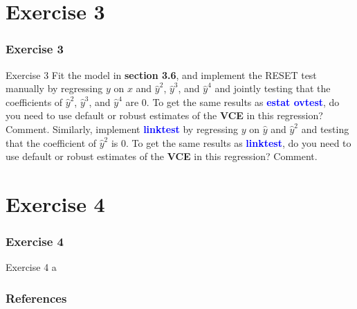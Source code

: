 \documentclass[11pt, aspectratio=169]{beamer}
\begin{document}
	\section{Exercise 3}
		\begin{frame}
			\frametitle{Exercise 3}
			\begin{block}{Exercise 3}
				Fit the model in \textcolor{red!50}{\textbf{section 3.6}}, and implement the RESET test manually by
				regressing $y$ on $x$ and $\hat{y}^{2}$, $\hat{y}^{3}$, and $\hat{y}^{4}$ and jointly testing that the
				coefficients of $\hat{y}^{2}$, $\hat{y}^{3}$, and $\hat{y}^{4}$ are $0$. 
				To get the same results as \textcolor{blue}{\textbf{estat ovtest}}, 
				do you need to use default or robust estimates of the \textbf{VCE} in
				this regression? Comment. Similarly, implement \textcolor{blue}{\textbf{linktest}} by
				regressing $y$ on $\hat{y}$ and $\hat{y}^{2}$ and testing that the coefficient of $\hat{y}^{2}$ is $0$. To
				get the same results as \textcolor{blue}{\textbf{linktest}}, do you need to use default or robust
				estimates of the \textbf{VCE} in this regression? Comment.
			\end{block}
		\end{frame}
	\section{Exercise 4}
		\begin{frame}
			\frametitle{Exercise 4}
			\begin{block}{Exercise 4}
				a
			\end{block}
		\end{frame}
	\begin{frame}[t,allowframebreaks]
		\frametitle{References}
		
		
		\nocite{cameron2022-I}
		\nocite{cameron2022-II}
	\end{frame}
	\begin{frame}
		\maketitle
	\end{frame}
\end{document}
